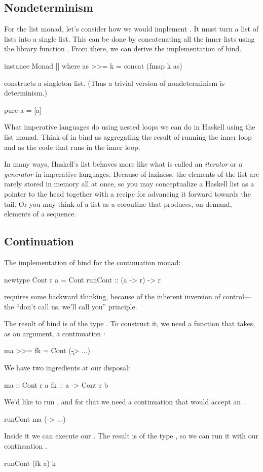 \documentclass[DaoFP]{subfiles}
\begin{document}
\subsection{Nondeterminism}

For the list monad, let's consider how we would implement . It must turn a list of lists into a single list. This can be done by concatenating all the inner lists using the library function . From there, we can derive the implementation of bind.
\begin{haskell}
instance Monad [] where
  as >>= k = concat (fmap k as)
\end{haskell}
 constructs a singleton list. (Thus a trivial version of nondeterminism is determinism.)
\begin{haskell}
  pure a = [a]
\end{haskell}

What imperative languages do using nested loops we can do in Haskell using the list monad. Think of  in bind as aggregating the result of running the inner loop and  as the code that runs in the inner loop. 

In many ways, Haskell's list behaves more like what is called an \emph{iterator} or a \emph{generator} in imperative languages. Because of laziness, the elements of the list are rarely stored in memory all at once, so you may conceptualize a Haskell list as a pointer to the head together with a recipe for advancing it forward towards the tail. Or you may think of a list as a coroutine that produces, on demand, elements of a sequence.

\subsection{Continuation}

The implementation of bind for the continuation monad:
\begin{haskell}
newtype Cont r a = Cont { runCont :: (a -> r) -> r }
\end{haskell}
requires some backward thinking, because of the inherent inversion of control---the ``don't call us, we'll call you'' principle. 

The result of bind is of the type . To construct it, we need a function that takes, as an argument, a continuation :
\begin{haskell}
ma >>= fk = Cont (\k -> ...)
\end{haskell}
We have two ingredients at our disposal: 
\begin{haskell}
ma :: Cont r a
fk :: a -> Cont r b
\end{haskell}
We'd like to run , and for that we need a continuation that would accept an .
\begin{haskell}
runCont ma (\a -> ...)
\end{haskell}
Inside it we can execute our . The result is of the type , so we can run it with our continuation . 
\begin{haskell}
runCont (fk a) k
\end{haskell}
\end{document}
